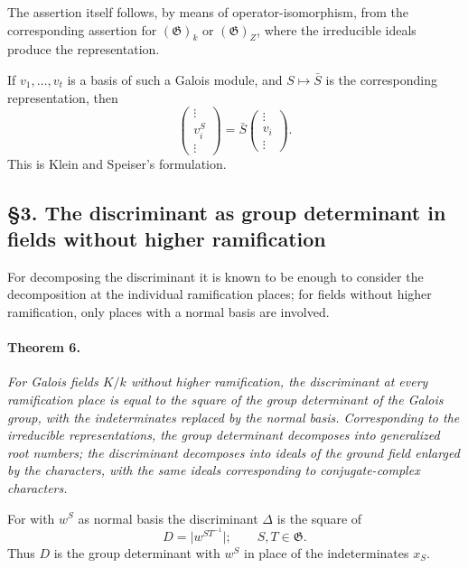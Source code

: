 \documentclass[11pt]{article}
\providecommand{\Gg}{\mathfrak G}
\begin{document}
The assertion itself follows, by means of operator-isomorphism, from the corresponding assertion for \((\Gg)_k\) or \((\Gg)_Z\), where the irreducible ideals produce the representation.

If \(v_1,
\ldots,v_t\) is a basis of such a Galois module, and \(S\mapsto\bar S\) is the corresponding representation, then
\[
        \begin{pmatrix}\vdots\\ v_i^S\\ \vdots\end{pmatrix}
        =\bar S\begin{pmatrix}\vdots\\ v_i\\ \vdots\end{pmatrix}.
\]
This is Klein and Speiser's formulation.

\subsection*{§3. The discriminant as group determinant in fields without higher ramification}

For decomposing the discriminant it is known to be enough to consider the decomposition at the individual ramification places; for fields without higher ramification, only places with a normal basis are involved.

\paragraph{Theorem 6.}
\emph{For Galois fields \(K/k\) without higher ramification, the discriminant at every ramification place is equal to the square of the group determinant of the Galois group, with the indeterminates replaced by the normal basis. Corresponding to the irreducible representations, the group determinant decomposes into generalized root numbers; the discriminant decomposes into ideals of the ground field enlarged by the characters, with the same ideals corresponding to conjugate-complex characters.}

For with \(w^S\) as normal basis the discriminant \(\Delta\) is the square of
\[
        D=\bigl|w^{ST^{-1}}\bigr|;
        \qquad S,T\in\Gg.
\]
Thus \(D\) is the group determinant with \(w^S\) in place of the indeterminates \(x_S\).
\end{document}

